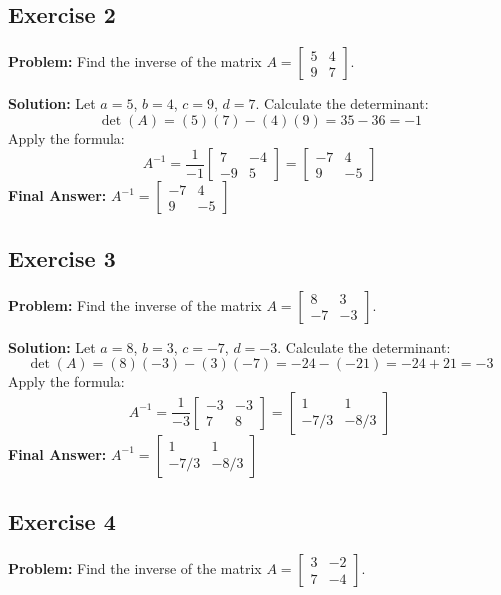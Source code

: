 \documentclass[11pt]{article}
\begin{document}
\subsection{Exercise 2}
\textbf{Problem:} Find the inverse of the matrix $A = \begin{bmatrix} 5 & 4 \\ 9 & 7 \end{bmatrix}$.

\textbf{Solution:}
Let $a=5$, $b=4$, $c=9$, $d=7$.
Calculate the determinant:
\[ \det(A) = (5)(7) - (4)(9) = 35 - 36 = -1 \]
Apply the formula:
\[ A^{-1} = \frac{1}{-1} \begin{bmatrix} 7 & -4 \\ -9 & 5 \end{bmatrix} = \begin{bmatrix} -7 & 4 \\ 9 & -5 \end{bmatrix} \]
\textbf{Final Answer:} $A^{-1} = \begin{bmatrix} -7 & 4 \\ 9 & -5 \end{bmatrix}$

\subsection{Exercise 3}
\textbf{Problem:} Find the inverse of the matrix $A = \begin{bmatrix} 8 & 3 \\ -7 & -3 \end{bmatrix}$.

\textbf{Solution:}
Let $a=8$, $b=3$, $c=-7$, $d=-3$.
Calculate the determinant:
\[ \det(A) = (8)(-3) - (3)(-7) = -24 - (-21) = -24 + 21 = -3 \]
Apply the formula:
\[ A^{-1} = \frac{1}{-3} \begin{bmatrix} -3 & -3 \\ 7 & 8 \end{bmatrix} = \begin{bmatrix} 1 & 1 \\ -7/3 & -8/3 \end{bmatrix} \]
\textbf{Final Answer:} $A^{-1} = \begin{bmatrix} 1 & 1 \\ -7/3 & -8/3 \end{bmatrix}$

\subsection{Exercise 4}
\textbf{Problem:} Find the inverse of the matrix $A = \begin{bmatrix} 3 & -2 \\ 7 & -4 \end{bmatrix}$.
\end{document}
